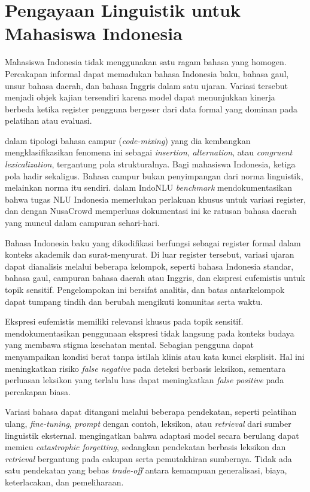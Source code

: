 \section{Pengayaan Linguistik untuk Mahasiswa Indonesia}
\label{sec:linguistik}

Mahasiswa Indonesia tidak menggunakan satu ragam bahasa yang homogen. Percakapan informal dapat memadukan bahasa Indonesia baku, bahasa gaul, unsur bahasa daerah, dan bahasa Inggris dalam satu ujaran. Variasi tersebut menjadi objek kajian tersendiri karena model dapat menunjukkan kinerja berbeda ketika register pengguna bergeser dari data formal yang dominan pada pelatihan atau evaluasi.

\textcite{muysken2000} dalam tipologi bahasa campur (\textit{code-mixing}) yang dia kembangkan mengklasifikasikan fenomena ini sebagai \textit{insertion}, \textit{alternation}, atau \textit{congruent lexicalization}, tergantung pola strukturalnya. Bagi mahasiswa Indonesia, ketiga pola hadir sekaligus. Bahasa campur bukan penyimpangan dari norma linguistik, melainkan norma itu sendiri. \textcite{wilie2020indonlu} dalam IndoNLU \textit{benchmark} mendokumentasikan bahwa tugas NLU Indonesia memerlukan perlakuan khusus untuk variasi register, dan \textcite{cahyawijaya2023nusacrowd} dengan NusaCrowd memperluas dokumentasi ini ke ratusan bahasa daerah yang muncul dalam campuran sehari-hari.

Bahasa Indonesia baku yang dikodifikasi \textcite{alwi2003} berfungsi sebagai register formal dalam konteks akademik dan surat-menyurat. Di luar register tersebut, variasi ujaran dapat dianalisis melalui beberapa kelompok, seperti bahasa Indonesia standar, bahasa gaul, campuran bahasa daerah atau Inggris, dan ekspresi eufemistis untuk topik sensitif. Pengelompokan ini bersifat analitis, dan batas antarkelompok dapat tumpang tindih dan berubah mengikuti komunitas serta waktu.

Ekspresi eufemistis memiliki relevansi khusus pada topik sensitif. \textcite{pendse2022} mendokumentasikan penggunaan ekspresi tidak langsung pada konteks budaya yang membawa stigma kesehatan mental. Sebagian pengguna dapat menyampaikan kondisi berat tanpa istilah klinis atau kata kunci eksplisit. Hal ini meningkatkan risiko \textit{false negative} pada deteksi berbasis leksikon, sementara perluasan leksikon yang terlalu luas dapat meningkatkan \textit{false positive} pada percakapan biasa.

Variasi bahasa dapat ditangani melalui beberapa pendekatan, seperti pelatihan ulang, \textit{fine-tuning}, \textit{prompt} dengan contoh, leksikon, atau \textit{retrieval} dari sumber linguistik eksternal. \textcite{luo2023catastrophic} mengingatkan bahwa adaptasi model secara berulang dapat memicu \textit{catastrophic forgetting}, sedangkan pendekatan berbasis leksikon dan \textit{retrieval} bergantung pada cakupan serta pemutakhiran sumbernya. Tidak ada satu pendekatan yang bebas \textit{trade-off} antara kemampuan generalisasi, biaya, keterlacakan, dan pemeliharaan.

